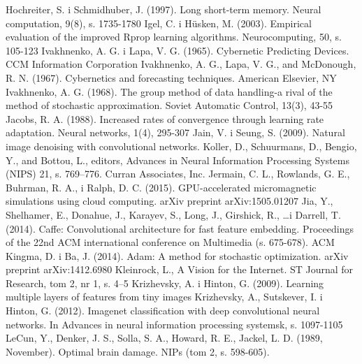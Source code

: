 \documentclass[12pt,a4paper,twoside]{article}
\begin{document}
\begin{thebibliography}{99}
 Hochreiter, S. i Schmidhuber, J. (1997). Long short-term memory. Neural computation, 9(8), s. 1735-1780
 Igel, C. i Hüsken, M. (2003). Empirical evaluation of the improved Rprop learning algorithms. Neurocomputing, 50, s. 105-123
 Ivakhnenko, A. G. i Lapa, V. G. (1965). Cybernetic Predicting Devices. CCM Information Corporation
 Ivakhnenko, A. G., Lapa, V. G., and McDonough, R. N. (1967). Cybernetics and forecasting techniques. American Elsevier, NY
 Ivakhnenko, A. G. (1968). The group method of data handling-a rival of the method of stochastic approximation. Soviet Automatic Control, 13(3), 43-55
 Jacobs, R. A. (1988). Increased rates of convergence through learning rate adaptation. Neural networks, 1(4), 295-307
 Jain, V. i Seung, S. (2009). Natural image denoising with convolutional networks. Koller, D., Schuurmans, D., Bengio, Y., and Bottou, L., editors, Advances in Neural Information Processing Systems (NIPS) 21, s. 769–776. Curran Associates, Inc.
 Jermain, C. L., Rowlands, G. E., Buhrman, R. A., i Ralph, D. C. (2015). GPU-accelerated micromagnetic simulations using cloud computing. arXiv preprint arXiv:1505.01207
 Jia, Y., Shelhamer, E., Donahue, J., Karayev, S., Long, J., Girshick, R., \ldots i Darrell, T. (2014). Caffe: Convolutional architecture for fast feature embedding. Proceedings of the 22nd ACM international conference on Multimedia (s. 675-678). ACM
 Kingma, D. i Ba, J. (2014). Adam: A method for stochastic optimization. arXiv preprint arXiv:1412.6980
 Kleinrock, L., A Vision for the Internet. ST Journal for Research, tom 2, nr 1, s. 4–5
 Krizhevsky, A. i Hinton, G. (2009). Learning multiple layers of features from tiny images
 Krizhevsky, A., Sutskever, I. i Hinton, G. (2012). Imagenet classification with deep convolutional neural networks. In Advances in neural information processing systemsk, s. 1097-1105
 LeCun, Y., Denker, J. S., Solla, S. A., Howard, R. E., Jackel, L. D. (1989, November). Optimal brain damage. NIPs (tom 2, s. 598-605).

\end{thebibliography}
\end{document}
